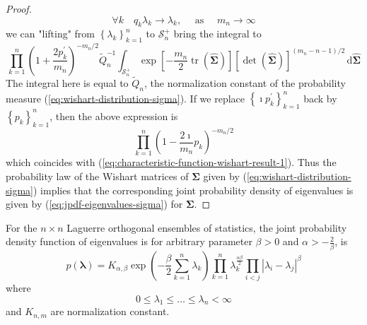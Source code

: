 \begin{proof}
\begin{equation*}
        \forall k\quad q_{k}\lambda_{k}\rightarrow\lambda_{k},\quad\text{ as }\quad m_{n}\rightarrow\infty
    \end{equation*}
    we can "lifting" from $\left\{\lambda_{k}\right\}_{k=1}^{n}$ to $\mathcal{S}_{n}^{+}$ bring the integral to
    \begin{equation*}
        \prod_{k=1}^{n}\left(1+\frac{2p_{k}^{\prime}}{m_{n}}\right)^{-m_{n}/2}\widetilde{Q}_{n}^{-1}\int_{\mathcal{S}_{n}^{+}}\exp\left[-\frac{m_{n}}{2}\operatorname{tr}\left(\widehat{\boldsymbol{\Sigma}}\right)\right]\left[\operatorname{det}\left(\widehat{\boldsymbol{\Sigma}}\right)\right]^{(m_{n}-n-1)/2}\,\mathrm{d}\widehat{\boldsymbol{\Sigma}}
    \end{equation*}
    The integral here is equal to $\widetilde{Q}_{n}$, the normalization constant of the probability measure (\ref{eq:wishart-distribution-sigma}). If we replace $\left\{\imath p_{k}^{\prime}\right\}_{k=1}^{n}$ back by $\left\{p_{k}\right\}_{k=1}^{n}$, then the above expression is
    \begin{equation*}
        \prod_{k=1}^{n}\left(1-\frac{2\imath}{m_n}p_{k}\right)^{-m_{n}/2}
    \end{equation*}
    which coincides with (\ref{eq:characteristic-function-wishart-result-1}). Thus the probability law of the Wishart matrices of $\boldsymbol{\Sigma}$ given by (\ref{eq:wishart-distribution-sigma}) implies that the corresponding joint probability density of eigenvalues is given by (\ref{eq:jpdf-eigenvalues-sigma}) for $\boldsymbol{\Sigma}$.
\end{proof}

\begin{definition}
    For the $n\times n$ Laguerre orthogonal ensembles of statistics, the joint probability density function of eigenvalues is
    for arbitrary parameter $\beta>0$ and $\alpha>-\frac{2}{\beta}$, is
    \begin{equation}
        p\left(\boldsymbol{\lambda}\right)=K_{\alpha,\beta}\exp\left(-\frac{\beta}{2}\sum_{k=1}^{n}\lambda_{k}\right)\prod_{k=1}^{n} \lambda_{k}^{\frac{\alpha\beta}{2}}\prod_{i<j}\left|\lambda_{i}-\lambda_{j}\right|^{\beta}
        \label{eq:laguerre-orthogonal-ensemble}
    \end{equation}
    where
    \begin{equation*}
        0\leq\lambda_{1}\leq\ldots\leq\lambda_{n}<\infty
    \end{equation*}
    and $K_{n,m}$ are normalization constant.
\end{definition}

